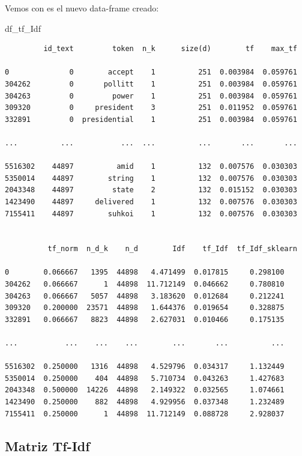 \documentclass[
  11pt,
  a4paper,
]{article}
\newenvironment{Shaded}{\begin{snugshade}}{\end{snugshade}}
\newcommand{\NormalTok}[1]{#1}
\begin{document}
Vemos con es el nuevo data-frame creado:

\begin{Shaded}
\begin{Highlighting}[]
\NormalTok{df\_tf\_Idf}
\end{Highlighting}
\end{Shaded}

\begin{verbatim}
         id_text         token  n_k      size(d)        tf    max_tf  
         
0              0        accept    1          251  0.003984  0.059761   
304262         0       pollitt    1          251  0.003984  0.059761   
304263         0         power    1          251  0.003984  0.059761   
309320         0     president    3          251  0.011952  0.059761   
332891         0  presidential    1          251  0.003984  0.059761   

...          ...           ...  ...          ...       ...       ...   

5516302    44897          amid    1          132  0.007576  0.030303   
5350014    44897        string    1          132  0.007576  0.030303   
2043348    44897         state    2          132  0.015152  0.030303   
1423490    44897     delivered    1          132  0.007576  0.030303   
7155411    44897        suhkoi    1          132  0.007576  0.030303   


          tf_norm  n_d_k    n_d        Idf    tf_Idf  tf_Idf_sklearn  
          
0        0.066667   1395  44898   4.471499  0.017815     0.298100  
304262   0.066667      1  44898  11.712149  0.046662     0.780810  
304263   0.066667   5057  44898   3.183620  0.012684     0.212241  
309320   0.200000  23571  44898   1.644376  0.019654     0.328875  
332891   0.066667   8823  44898   2.627031  0.010466     0.175135  

...           ...    ...    ...        ...       ...          ...  

5516302  0.250000   1316  44898   4.529796  0.034317     1.132449  
5350014  0.250000    404  44898   5.710734  0.043263     1.427683  
2043348  0.500000  14226  44898   2.149322  0.032565     1.074661  
1423490  0.250000    882  44898   4.929956  0.037348     1.232489  
7155411  0.250000      1  44898  11.712149  0.088728     2.928037  
\end{verbatim}

\hypertarget{matriz-tf-idf}{%
\subsection{Matriz Tf-Idf}\label{matriz-tf-idf}}
\end{document}
